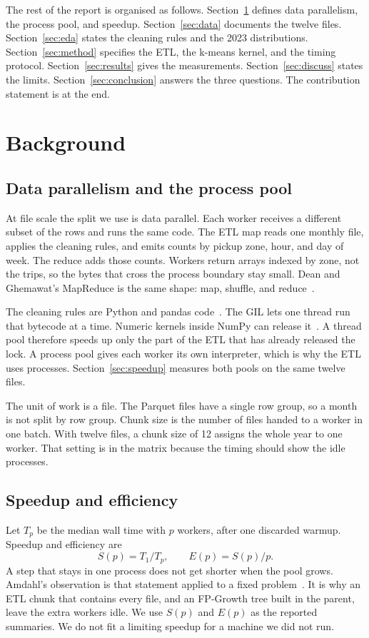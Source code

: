 \documentclass[11pt,a4paper]{article}
\begin{document}
The rest of the report is organised as follows. Section~\ref{sec:background} defines data parallelism, the process pool, and speedup. Section~\ref{sec:data} documents the twelve files. Section~\ref{sec:eda} states the cleaning rules and the 2023 distributions. Section~\ref{sec:method} specifies the ETL, the k-means kernel, and the timing protocol. Section~\ref{sec:results} gives the measurements. Section~\ref{sec:discuss} states the limits. Section~\ref{sec:conclusion} answers the three questions. The contribution statement is at the end.

\section{Background}
\label{sec:background}

\subsection{Data parallelism and the process pool}
At file scale the split we use is data parallel. Each worker receives a different subset of the rows and runs the same code. The ETL map reads one monthly file, applies the cleaning rules, and emits counts by pickup zone, hour, and day of week. The reduce adds those counts. Workers return arrays indexed by zone, not the trips, so the bytes that cross the process boundary stay small. Dean and Ghemawat's MapReduce is the same shape: map, shuffle, and reduce~\cite{dean2004}.

The cleaning rules are Python and pandas code~\cite{mckinney2010}. The GIL lets one thread run that bytecode at a time. Numeric kernels inside NumPy can release it~\cite{harris2020}. A thread pool therefore speeds up only the part of the ETL that has already released the lock. A process pool gives each worker its own interpreter, which is why the ETL uses processes. Section~\ref{sec:speedup} measures both pools on the same twelve files.

The unit of work is a file. The Parquet files have a single row group, so a month is not split by row group. Chunk size is the number of files handed to a worker in one batch. With twelve files, a chunk size of 12 assigns the whole year to one worker. That setting is in the matrix because the timing should show the idle processes.

\subsection{Speedup and efficiency}
Let $T_p$ be the median wall time with $p$ workers, after one discarded warmup. Speedup and efficiency are
\begin{equation}
S(p) = T_1 / T_p, \qquad E(p) = S(p) / p.
\end{equation}
A step that stays in one process does not get shorter when the pool grows. Amdahl's observation is that statement applied to a fixed problem~\cite{amdahl1967}. It is why an ETL chunk that contains every file, and an FP-Growth tree built in the parent, leave the extra workers idle. We use $S(p)$ and $E(p)$ as the reported summaries. We do not fit a limiting speedup for a machine we did not run.
\end{document}
